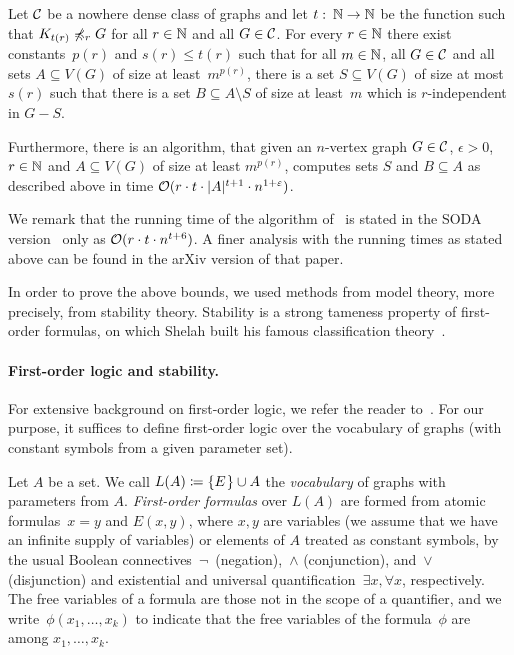 \begin{theorem}\label{thm:uqw}
  Let $\mathcal{C}$ be a nowhere dense class of graphs and let 
  $t\,\colon\,\mathbb{N}\rightarrow \mathbb{N}$ be the function such that
  $K_{t(r)}\not\preccurlyeq_r G$ for all $r\in \mathbb{N}$ and all $G\in \mathcal{C}$.  
  For every $r\in \mathbb{N}$
  there exist constants~$p(r)$ and $s(r)\leq t(r)$ such that
  for all $m\in \mathbb{N}$, all $G\in\mathcal{C}$ and all sets $A\subseteq V(G)$ of size at 
  least~$m^{p(r)}$, there is a set $S\subseteq V(G)$ of size at
  most $s(r)$ such that there is a set $B\subseteq A\setminus S$ of size at
  least~$m$ which is $r$-independent in $G-S$.
  
  Furthermore, there is an algorithm, that given an $n$-vertex graph
  $G\in \mathcal{C}$, $\epsilon>0$, $r\in \mathbb{N}$ and $A\subseteq V(G)$ of size at least
  $m^{p(r)}$, computes sets $S$ and $B\subseteq A$ as described above
  in
  time $\mathcal{O}(r\cdot t\cdot |A|^{t+1}\cdot n^{1+\varepsilon})$.
\end{theorem}

We remark that the running time of the algorithm of~
is stated in the SODA version~\cite{siebertz2016polynomial} only as 
$\mathcal{O}(r\cdot t\cdot n^{t+6})$. A finer analysis with the running
times as stated above can be found in the arXiv version of that paper.

In order to prove the above bounds, we used methods from model
theory, more precisely, from stability theory. Stability is a strong tameness
property of first-order formulas, on which Shelah built his famous 
classification theory~\cite{shelah1990classification}.


\paragraph{First-order logic and stability.}
For extensive background on first-order logic, we refer the reader
to~\cite{hodges1993model}. For our purpose, it suffices to define
first-order logic over the vocabulary of graphs (with constant symbols
from a given parameter set).
 
Let $A$ be a set. We call $L(A)\coloneqq\{E\hspace{0.3mm}\}\cup A$ the \emph{vocabulary}
of graphs with parameters from $A$. \emph{First-order formulas} over $L(A)$ are
formed from atomic formulas~$x=y$ and $E(x,y)$, where $x,y$ are variables (we
assume that we have an infinite supply of variables) or elements of $A$ treated
as constant symbols, by the usual Boolean
connectives~$\neg$~(negation),~$\wedge$ (conjunction), and~$\vee$ (disjunction)
and existential and universal quantification~$\exists x,\forall x$,
respectively.  The free variables of a formula are those not in the scope of a
quantifier, and we write~$\phi(x_1,\ldots,x_k)$ to indicate that the free
variables of the formula~$\phi$ are among $x_1,\ldots,x_k$.

